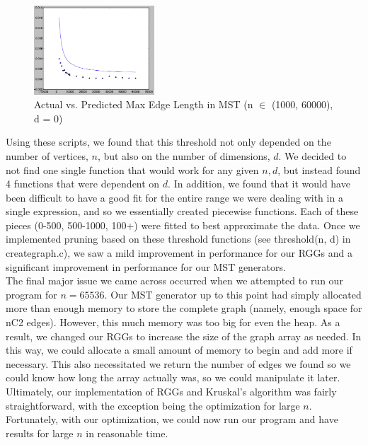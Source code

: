 \documentclass[12pt]{article}
\begin{document}
\begin{figure}
\centering
\includegraphics[width=0.4\textwidth]{img/knd0n3.png}
\caption{Actual vs. Predicted Max Edge Length in MST (n $\in$ (1000, 60000), d = 0)}
\end{figure}

Using these scripts, we found that this threshold not only depended on the number of vertices, $n$, but also on the number of dimensions, $d$. We decided to not find one single function that would work for any given $n, d$, but instead found 4 functions that were dependent on $d$. In addition, we found that it would have been difficult to have a good fit for the entire range we were dealing with in a single expression, and so we essentially created piecewise functions. Each of these pieces (0-500, 500-1000, 100+) were fitted to best approximate the data. Once we implemented pruning based on these threshold functions (see threshold(n, d) in creategraph.c), we saw a mild improvement in performance for our RGGs and a significant improvement in performance for our MST generators. \\

The final major issue we came across occurred when we attempted to run our program for $n = 65536$. Our MST generator up to this point had simply allocated more than enough memory to store the complete graph (namely, enough space for nC2 edges). However, this much memory was too big for even the heap. As a result, we changed our RGGs to increase the size of the graph array as needed. In this way, we could allocate a small amount of memory to begin and add more if necessary. This also necessitated we return the number of edges we found so we could know how long the array actually was, so we could manipulate it later. \\

Ultimately, our implementation of RGGs and Kruskal's algorithm was fairly straightforward, with the exception being the optimization for large $n$. Fortunately, with our optimization, we could now run our program and have results for large $n$ in reasonable time. \\
\end{document}
